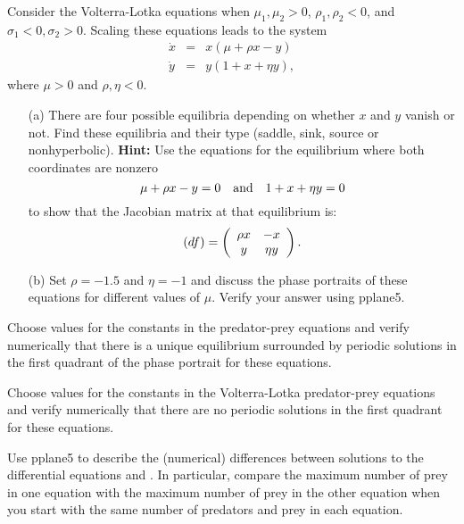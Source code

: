 \documentclass{ximera}
\begin{document}
\begin{exercise} \label{c9.1.1}
Consider the Volterra-Lotka equations when $\mu_1,\mu_2>0$, 
$\rho_1,\rho_2 < 0$, and $\sigma_1<0,\sigma_2>0$. Scaling these 
equations leads to the system
\begin{equation*}
\begin{array}{rcl}
\dot{x} & = & x(\mu + \rho x -         y)  \\
\dot{y} & = & y(  1 +        x +  \eta y),
\end{array}
\end{equation*}
where $\mu>0$ and $\rho,\eta<0$.  
\begin{itemize}
\item[(a)]  There are four possible equilibria depending on whether $x$ and 
$y$ vanish or not.  Find these equilibria and their type (saddle, sink, 
source or nonhyperbolic).  {\bf Hint:} Use the equations for the equilibrium 
where both coordinates are nonzero 
\[
\mu + \rho x - y = 0 \quad\mbox{and}\quad  1 + x +  \eta y = 0
\]
to show that the Jacobian matrix at that equilibrium is:
\[
(df) =\left(\begin{array}{cc} \rho x & -x\\ y &\eta y\end{array}\right).
\]
\item[(b)]  Set $\rho=-1.5$ and $\eta=-1$ and discuss the phase portraits 
of these equations for different values of $\mu$.  Verify your answer 
using {\sf pplane5}. 
\end{itemize}
\end{exercise}



\CEXER

\begin{exercise} \label{c9.1.3}
Choose values for the constants in the predator-prey equations 
 and verify numerically that there is a unique 
equilibrium surrounded by periodic solutions in the first 
quadrant of the phase portrait for these equations.
\end{exercise}

\begin{exercise} \label{c9.1.4}
Choose values for the constants in the Volterra-Lotka predator-prey equations 
 and verify numerically that there are no periodic solutions in 
the first quadrant for these equations.
\end{exercise}

\begin{exercise} \label{c9.1.7}
Use {\sf pplane5} to describe the (numerical) differences between solutions 
to the differential equations  and .  In particular,
compare the maximum number of prey in one equation with the maximum number of 
prey in the other equation when you start with the same number of predators 
and prey in each equation.
\end{exercise}
\end{document}
